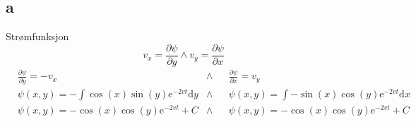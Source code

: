 \documentclass[a4paper,10pt,norsk]{article}
\newcommand{\dd}[1]{\mathrm{d}#1}
\begin{document}
	\subsection*{a}
	Strømfunksjon \[
	v_x = \frac{\partial \psi}{\partial y}  \wedge v_y = \frac{\partial \psi}{\partial x} 
	\] 
	\begin{align*}
		& \frac{\partial \psi}{\partial y} = -v_x
		& \wedge &
		& \frac{\partial \psi}{\partial x} = v_y\\
		& \psi (x,y) = - \int \cos(x) \sin(y) \mathrm{e} ^{-2vt} \dd{y}
		& \wedge &
		& \psi (x,y) = \int -\sin(x) \cos(y) \mathrm{e}^{-2vt} \dd{x}\\
		& \psi (x,y) = - \cos(x) \cos(y)  \mathrm{e}^{-2vt} + C
		& \wedge &
		& \psi (x,y) = - \cos(x) \cos(y)  \mathrm{e}^{-2vt} + C
	\end{align*}
\end{document}
